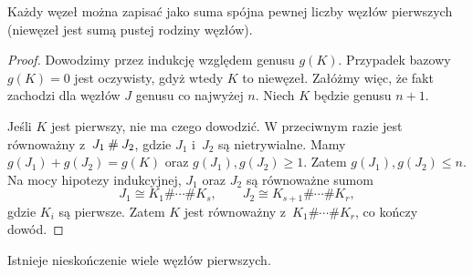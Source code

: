 \begin{proposition}
    Każdy węzeł można zapisać jako suma spójna pewnej liczby węzłów pierwszych (niewęzeł jest sumą pustej rodziny węzłów).
\end{proposition}

\begin{proof}
    Dowodzimy przez indukcję względem genusu $g(K)$.
    Przypadek bazowy $g(K) = 0$ jest oczywisty, gdyż wtedy $K$ to niewęzeł.
    Załóżmy więc, że fakt zachodzi dla węzłów $J$ genusu co najwyżej $n$.
    Niech $K$ będzie genusu $n + 1$.

    Jeśli $K$ jest pierwszy, nie ma czego dowodzić.
    W przeciwnym razie jest równoważny z~$J_1 \mathbin{\#} J_2$, gdzie $J_1$ i~$J_2$ są nietrywialne.
    Mamy $g(J_1)+g(J_2)=g(K)$ oraz $g(J_1),g(J_2)\geqslant 1$.
    Zatem $g(J_1),g(J_2)\leqslant n$.
    Na mocy hipotezy indukcyjnej, $J_1$ oraz $J_2$ są równoważne sumom
    \[
        J_1 \cong K_1\#\cdots\# K_s,\qquad
        J_2 \cong K_{s+1}\#\cdots\# K_r,
    \]
    gdzie $K_i$ są pierwsze.
    Zatem $K$ jest równoważny z~$K_1\#\cdots\# K_r$, co kończy dowód.
\end{proof}

\begin{proposition}
\label{infty_primes}
    Istnieje nieskończenie wiele węzłów pierwszych.
\end{proposition}

